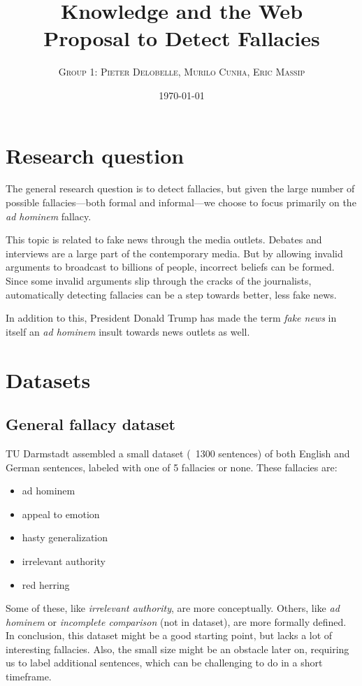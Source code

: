\documentclass[a4paper]{article}
\begin{document}
\title{Knowledge and the Web \\ 
\large{Proposal to Detect Fallacies}}
\author{\textsc{Group 1: Pieter Delobelle, Murilo Cunha, Eric Massip}}
\date{\today}
\maketitle

\section{Research question}
The general research question is to detect fallacies, but given the large number of possible fallacies---both formal and informal---we choose to focus primarily on the \emph{ad hominem} fallacy. 

This topic is related to fake news through the media outlets. Debates and interviews are a large part of the contemporary media. But by allowing invalid arguments to broadcast to billions of people, incorrect beliefs can be formed. Since some invalid arguments slip through the cracks of the journalists, automatically detecting fallacies can be a step towards better, less fake news.

In addition to this, President Donald Trump has made the term \emph{fake news} in itself an \emph{ad hominem} insult towards news outlets as well. 

\section{Datasets}

\subsection{General fallacy dataset~\cite{Habernal.et.al.2017.EMNLP}}
TU Darmstadt assembled a small dataset (~1300 sentences) of both English and German sentences, labeled with one of 5 fallacies or none. These fallacies are:

\begin{itemize}
    \item ad hominem
    \item appeal to emotion
    \item hasty generalization
    \item irrelevant authority
    \item red herring
\end{itemize}

Some of these, like \emph{irrelevant authority}, are more conceptually. Others, like \emph{ad hominem} or \emph{incomplete comparison} (not in dataset), are more formally defined. In conclusion, this dataset might be a good starting point, but lacks a lot of interesting fallacies. Also, the small size might be an obstacle later on, requiring us to label additional sentences, which can be challenging to do in a short timeframe. 
\end{document}
